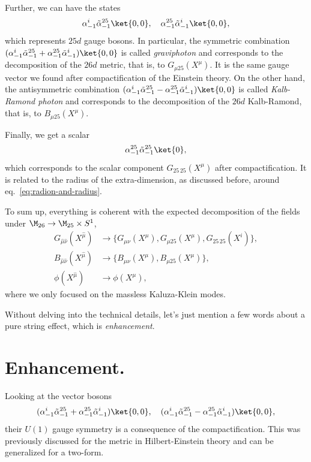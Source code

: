Further, we can have the states
\begin{equation}\label{eq:comp-vectors}
    \alpha^{i}_{-1} \tilde{\alpha}^{25}_{-1}\ket{0,0}, \quad \alpha^{25}_{-1} \tilde{\alpha}^{i}_{-1} \ket{0,0},
\end{equation}
which represents $25d$ gauge bosons. In particular, the symmetric combination $(\alpha^{i}_{-1} \tilde{\alpha}^{25}_{-1}+ \alpha^{25}_{-1} \tilde{\alpha}^{i}_{-1}) \ket{0,0}$ is called \emph{graviphoton} and corresponds to the decomposition of the $26d$ metric, that is, to $G_{\mu 25}(X^\mu)$. It is the same gauge vector we found after compactification of the Einstein theory. On the other hand, the antisymmetric combination $(\alpha^{i}_{-1} \tilde{\alpha}^{25}_{-1} - \alpha^{25}_{-1} \tilde{\alpha}^{i}_{-1}) \ket{0,0}$ is called \emph{Kalb-Ramond photon} and corresponds to the decomposition of the $26d$ Kalb-Ramond, that is, to $B_{\mu 25}(X^\mu)$.

Finally, we get a scalar
\begin{equation}\label{eq:comp-scalar}
    \alpha^{25}_{-1} \tilde{\alpha}^{25}_{-1} \ket{0},
\end{equation}
which corresponds to the scalar component $G_{25 \, 25}(X^\mu)$ after compactification. It is related to the radius of the extra-dimension, as discussed before, around eq.~\eqref{eq:radion-and-radius}.

To sum up, everything is coherent with the expected decomposition of the fields under $\M_{26} \to \M_{25} \times S^1$,
\begin{equation}
\begin{aligned}
    G_{\hat{\mu}\hat{\nu}} (X^{\hat{\mu}}) &\to \{ G_{\mu\nu}(X^\mu), G_{\mu 25} (X^\mu), G_{25 \, 25}(X^i) \},\\
    B_{\hat{\mu}\hat{\nu}} (X^{\hat{\mu}}) &\to \{ B_{\mu\nu}(X^\mu), B_{\mu 25}(X^\mu) \},\\
    \phi (X^{\hat{\mu}}) &\to \phi(X^\mu),
\end{aligned}
\end{equation}
where we only focused on the massless Kaluza-Klein modes.

Without delving into the technical details, let's just mention a few words about a pure string effect, which is \emph{enhancement}.

\section{Enhancement.}
Looking at the vector bosons
\begin{equation}
    (\alpha^{i}_{-1} \tilde{\alpha}^{25}_{-1}+ \alpha^{25}_{-1} \tilde{\alpha}^{i}_{-1}) \ket{0,0}, \quad (\alpha^{i}_{-1} \tilde{\alpha}^{25}_{-1} - \alpha^{25}_{-1} \tilde{\alpha}^{i}_{-1}) \ket{0,0},
\end{equation}
their $U(1)$ gauge symmetry is a consequence of the compactification. This was previously discussed for the metric in Hilbert-Einstein theory and can be generalized for a two-form. 

